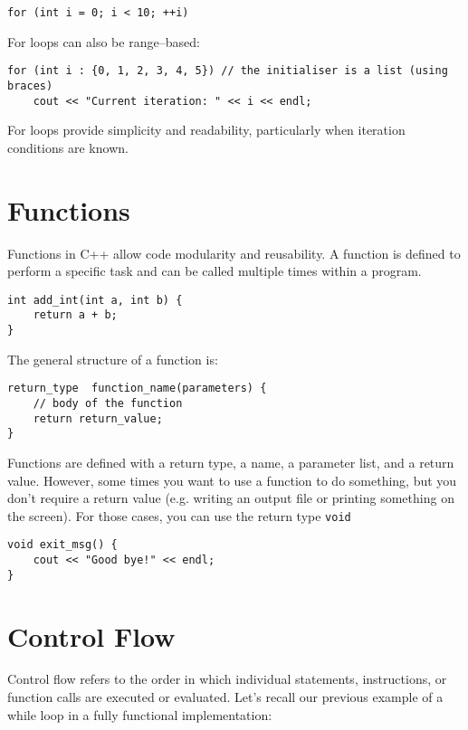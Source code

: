 \documentclass{article}
\begin{document}
\begin{verbatim}
for (int i = 0; i < 10; ++i) 
\end{verbatim}

For loops can also be range--based:

\begin{verbatim}
for (int i : {0, 1, 2, 3, 4, 5}) // the initialiser is a list (using braces)
    cout << "Current iteration: " << i << endl;
\end{verbatim}

For loops provide simplicity and readability, particularly when iteration conditions are known.

\section{Functions}

Functions in C++ allow code modularity and reusability. A function is defined to perform a specific task and can be called multiple times within a program.

\begin{verbatim}
int add_int(int a, int b) {
    return a + b;
}
\end{verbatim}

The general structure of a function is:

\begin{verbatim}
return_type  function_name(parameters) {
    // body of the function
    return return_value;
}
\end{verbatim}

Functions are defined with a return type, a name, a parameter list, and a return value. However, some times you want to use a function to do something, but you don't require a return value (e.g. writing an output file or printing something on the screen). For those cases, you can use the return type \verb|void|

\begin{verbatim}
void exit_msg() {
    cout << "Good bye!" << endl;
}
\end{verbatim}


\section{Control Flow}
Control flow refers to the order in which individual statements, instructions, or function calls are executed or evaluated. Let's recall our previous example of a while loop in a fully functional implementation:
\end{document}
